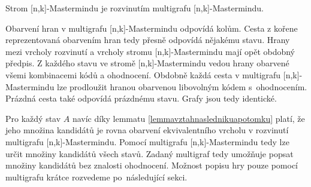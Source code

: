 \begin{veta}
    Strom [n,k]-Mastermindu je rozvinutím multigrafu [n,k]-Mastermindu.
\end{veta}
\begin{dukaz}
    Obarvení hran v multigrafu [n,k]-Mastermindu odpovídá kolům. Cesta z kořene reprezentovaná obarvením hran tedy přesně odpovídá nějakému stavu. Hrany mezi vrcholy rozvinutí a vrcholy stromu [n,k]-Mastermindu mají opět obdobný předpis. Z každého stavu ve stromě [n,k]-Mastermindu vedou hrany obarvené všemi kombinacemi kódů a ohodnocení. Obdobně každá cesta v multigrafu [n,k]-Mastermindu lze prodloužit hranou obarvenou libovolným kódem s~ohodnocením. Prázdná cesta také odpovídá prázdnému stavu. Grafy jsou tedy identické. 
    



\end{dukaz}
Pro každý stav $A$ navíc díky lemmatu \ref{lemmavztahnaslednikuapotomku} platí, že jeho množina kandidátů je rovna obarvení ekvivalentního vrcholu v rozvinutí multigrafu [n,k]-Mastermindu. Pomocí multigrafu [n,k]-Mastermindu tedy lze určit množiny kandidátů všech stavů. Zadaný multigraf tedy umožňuje popsat množiny kandidátů bez znalosti ohodnocení. Možnost popisu hry pouze pomocí multigrafu krátce rozvedeme po~následující sekci. 


